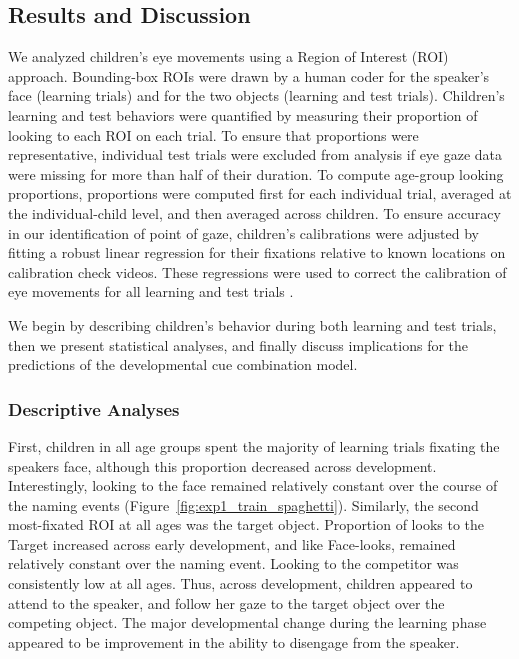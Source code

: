 \documentclass[man,floatsintext]{apa6}
\begin{document}
\subsection{Results and Discussion}

We analyzed children's eye movements using a Region of Interest (ROI) approach. Bounding-box ROIs were drawn by a human coder for the speaker's face (learning trials) and for the two objects (learning and test trials). Children's learning and test behaviors were quantified by measuring their proportion of looking to each ROI on each trial. To ensure that proportions were representative, individual test trials were excluded from analysis if eye gaze data were missing for more than half of their duration. To compute age-group looking proportions, proportions were computed first for each individual trial, averaged at the individual-child level, and then averaged across children. To ensure accuracy in our identification of point of gaze, children's calibrations were adjusted by fitting a robust linear regression for their fixations relative to known locations on calibration check videos. These regressions were used to correct the calibration of eye movements for all learning and test trials \cite{Frank2012d}.

We begin by describing children's behavior during both learning and test trials, then we present statistical analyses, and finally discuss implications for the predictions of the developmental cue combination model. 

\subsubsection{Descriptive Analyses}

First, children in all age groups spent the majority of learning trials fixating the speakers face, although this proportion decreased across development. Interestingly, looking to the face remained relatively constant over the course of the naming events (Figure~\ref{fig:exp1_train_spaghetti}). Similarly, the second most-fixated ROI at all ages was the target object. Proportion of looks to the Target increased across early development, and like Face-looks, remained relatively constant over the naming event. Looking to the competitor was consistently low at all ages. Thus, across development, children appeared to attend to the speaker, and follow her gaze to the target object over the competing object. The major developmental change during the learning phase appeared to be improvement in the ability to disengage from the speaker.
\end{document}
